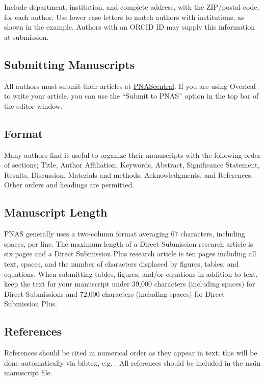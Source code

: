 \documentclass[9pt,twocolumn,twoside,lineno]{pnas-new}\usepackage[]{graphicx}\usepackage[]{xcolor}
\begin{document}
Include department, institution, and complete address, with the ZIP/postal code, for each author. Use lower case letters to match authors with institutions, as shown in the example. Authors with an ORCID ID may supply this information at submission.

\subsection*{Submitting Manuscripts}

All authors must submit their articles at \href{http://www.pnascentral.org/cgi-bin/main.plex}{PNAScentral}. If you are using Overleaf to write your article, you can use the ``Submit to PNAS'' option in the top bar of the editor window. 

\subsection*{Format}

Many authors find it useful to organize their manuscripts with the following order of sections;  Title, Author Affiliation, Keywords, Abstract, Significance Statement, Results, Discussion, Materials and methods, Acknowledgments, and References. Other orders and headings are permitted.

\subsection*{Manuscript Length}

PNAS generally uses a two-column format averaging 67 characters, including spaces, per line. The maximum length of a Direct Submission research article is six pages and a Direct Submission Plus research article is ten pages including all text, spaces, and the number of characters displaced by figures, tables, and equations.  When submitting tables, figures, and/or equations in addition to text, keep the text for your manuscript under 39,000 characters (including spaces) for Direct Submissions and 72,000 characters (including spaces) for Direct Submission Plus.

\subsection*{References}

References should be cited in numerical order as they appear in text; this will be done automatically via bibtex, e.g. . All references should be included in the main manuscript file.  
\end{document}
